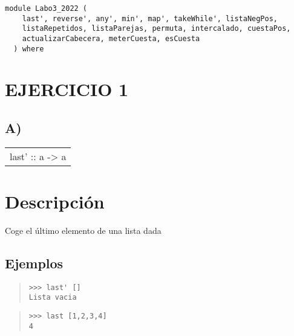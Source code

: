 \label{module:Labo3_2022}
\haddockbeginheader
{\haddockverb\begin{verbatim}
module Labo3_2022 (
    last', reverse', any', min', map', takeWhile', listaNegPos,
    listaRepetidos, listaParejas, permuta, intercalado, cuestaPos,
    actualizarCabecera, meterCuesta, esCuesta
  ) where\end{verbatim}}
\haddockendheader

\section{EJERCICIO 1}
\subsection{A)}
\begin{haddockdesc}
\item[\begin{tabular}{@{}l}
last' :: {\char 91}a{\char 93} -> a
\end{tabular}]
{\haddockbegindoc
\section*{Descripción}
Coge el último elemento de una lista dada\par
\subsection*{Ejemplos}
\begin{quote}
{\haddockverb\begin{verbatim}
>>> last' []
Lista vacia

\end{verbatim}}
\end{quote}
\begin{quote}
{\haddockverb\begin{verbatim}
>>> last [1,2,3,4]
4

\end{verbatim}}
\end{quote}}
\end{haddockdesc}
